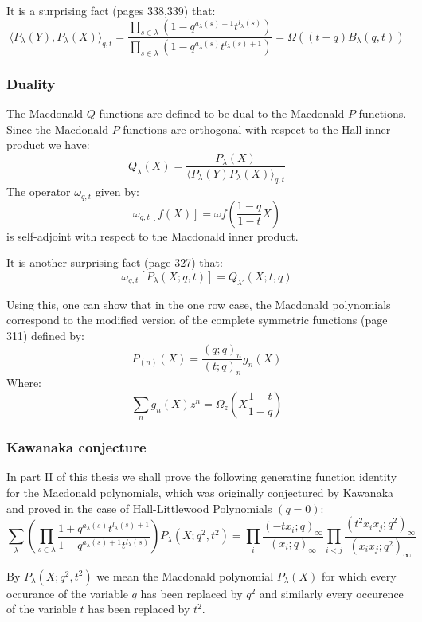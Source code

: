 \documentclass[12pt,dvips]{amsart}
\begin{document}
\medskip
\noindent
It is a surprising fact \cite{BLACK} (pages 338,339) that:
$$ \langle P_\lambda(Y), P_\lambda(X) \rangle_{q,t} = \frac{\prod_{s \in \lambda}(1 - q^{a_\lambda(s)+1} t^{l_\lambda(s)})}{\prod_{s \in \lambda}(1 - q^{a_\lambda(s)} t^{l_\lambda(s)+1})} 
= \Omega ( (t-q) B_\lambda(q,t) ) $$






\subsubsection{Duality}
The Macdonald $Q$-functions are defined to be dual to the Macdonald $P$-functions. Since the Macdonald $P$-functions are orthogonal with respect to the Hall inner product we have:
$$ Q_\lambda(X) = \frac{P_\lambda(X)}{\langle P_\lambda(Y) P_\lambda(X) \rangle_{q,t}} $$
The operator $\omega_{q,t}$ given by:
$$ \omega_{q,t} [f(X)] = \omega f\left(\frac{1-q}{1-t}X\right) $$
is self-adjoint with respect to the Macdonald inner product.

\medskip
\noindent
It is another surprising fact  \cite{BLACK} (page 327) that:
$$ \omega_{q,t}[ P_\lambda(X;q,t) ] = Q_{\lambda'}(X;t,q) $$


Using this, one can show that in the one row case, the Macdonald polynomials correspond to the modified version of the complete symmetric functions \cite{BLACK} (page 311) defined by:
$$P_{(n)}(X) = \frac{(q;q)_n}{(t;q)_n} g_n(X)$$
Where:
$$ \sum_n g_n(X)z^n = \Omega_z \left( X\frac{1-t}{1-q} \right)$$


\subsubsection{Kawanaka conjecture}
In part II of this thesis we shall prove the following generating function identity for the Macdonald polynomials, which was originally conjectured by Kawanaka \cite{KAWANAKA} and proved in the case of Hall-Littlewood Polynomials $(q=0)$:
$$ \sum_\lambda  \left ( 
\prod_{s \in \lambda} \frac{1 + q^{a_\lambda(s)} t^{l_\lambda(s)+1}}{1 - q^{a_\lambda(s)+1} t^{l_\lambda(s)}} \right )
P_\lambda(X;q^2,t^2) = \prod_i \frac{(-t x_i ; q)_{\infty}}{(x_i;q)_{\infty}} \prod_{i < j} \frac{(t^2 x_i x_j; q^2)_\infty}{(x_i x_j; q^2)_\infty}$$





\medskip
\noindent
By $P_\lambda(X;q^2,t^2)$ we mean the Macdonald polynomial $P_\lambda(X)$ for which every occurance of the variable $q$ has been replaced by $q^2$ and similarly every occurence of the variable $t$ has been replaced by $t^2$. 
\end{document}
